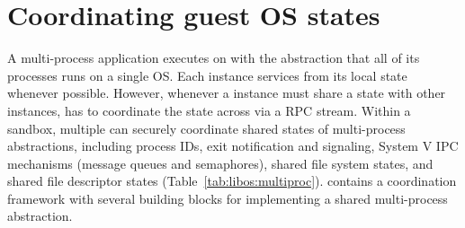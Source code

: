 \section{Coordinating guest OS states}
\label{sec:libos:namespaces}



A multi-process application executes on \graphene{} 
with the abstraction that all of its processes runs on a single OS.
Each \thelibos{} instance services \linuxapis{}
from its local state whenever possible.
However, whenever a \thelibos{} instance must share a \libos{} state with other instances,
\thelibos{} has to coordinate the state across \picoprocs{}
via a RPC stream.
Within a sandbox, multiple \picoprocs{} 
can securely coordinate shared states of multi-process abstractions, including process IDs, exit notification and signaling, 
System V IPC mechanisms (message queues and semaphores), shared file system states, and shared file descriptor states (Table~\ref{tab:libos:multiproc}).
\thelibos{} contains a coordination framework
with several building blocks for implementing a shared multi-process abstraction.

